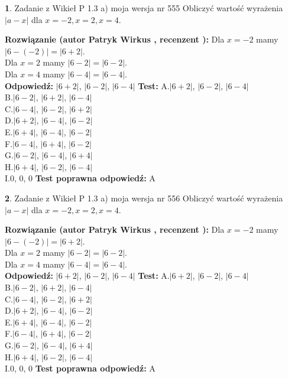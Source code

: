 \documentclass[12pt, a4paper]{article}
\theoremstyle{definition} %
\newtheorem{zad}{}
\newcommand{\zadStart}[1]{\begin{zad}#1\newline}
\newcommand{\zadStop}{\end{zad}}
\newcommand{\rozwStart}[2]{\noindent \textbf{Rozwiązanie (autor #1 , recenzent #2): }\newline}
\newcommand{\rozwStop}{\newline}
\newcommand{\odpStart}{\noindent \textbf{Odpowiedź:}\newline}
\newcommand{\odpStop}{\newline}
\newcommand{\testStart}{\noindent \textbf{Test:}\newline}
\newcommand{\testStop}{\newline}
\newcommand{\kluczStart}{\noindent \textbf{Test poprawna odpowiedź:}\newline}
\newcommand{\kluczStop}{\newline}
\begin{document}
\zadStart{Zadanie z Wikieł P 1.3 a) moja wersja nr 555}
Obliczyć wartość wyrażenia $|a - x|$ dla $x=-2,x=2,x=4$.
\zadStop
\rozwStart{Patryk Wirkus}{}
Dla $x = -2$ mamy $|6 - (-2)| = |6 + 2|$.\\
Dla $x = 2$ mamy $|6 - 2| = |6 - 2|$.\\
Dla $x = 4$ mamy $|6 - 4| = |6 - 4|$.\\
\rozwStop
\odpStart
$|6 + 2|$, $|6 - 2|$, $|6 - 4|$
\odpStop
\testStart
A.$|6 + 2|$, $|6 - 2|$, $|6 - 4|$\\
B.$|6 - 2|$, $|6 + 2|$, $|6 - 4|$\\
C.$|6 - 4|$, $|6 - 2|$, $|6 + 2|$\\
D.$|6 + 2|$, $|6 - 4|$, $|6 - 2|$\\
E.$|6 + 4|$, $|6 - 4|$, $|6 - 2|$\\
F.$|6 - 4|$, $|6 + 4|$, $|6 - 2|$\\
G.$|6 - 2|$, $|6 - 4|$, $|6 + 4|$\\
H.$|6 + 4|$, $|6 - 2|$, $|6 - 4|$\\
I.$0$, $0$, $0$
\testStop
\kluczStart
A
\kluczStop



\zadStart{Zadanie z Wikieł P 1.3 a) moja wersja nr 556}
Obliczyć wartość wyrażenia $|a - x|$ dla $x=-2,x=2,x=4$.
\zadStop
\rozwStart{Patryk Wirkus}{}
Dla $x = -2$ mamy $|6 - (-2)| = |6 + 2|$.\\
Dla $x = 2$ mamy $|6 - 2| = |6 - 2|$.\\
Dla $x = 4$ mamy $|6 - 4| = |6 - 4|$.\\
\rozwStop
\odpStart
$|6 + 2|$, $|6 - 2|$, $|6 - 4|$
\odpStop
\testStart
A.$|6 + 2|$, $|6 - 2|$, $|6 - 4|$\\
B.$|6 - 2|$, $|6 + 2|$, $|6 - 4|$\\
C.$|6 - 4|$, $|6 - 2|$, $|6 + 2|$\\
D.$|6 + 2|$, $|6 - 4|$, $|6 - 2|$\\
E.$|6 + 4|$, $|6 - 4|$, $|6 - 2|$\\
F.$|6 - 4|$, $|6 + 4|$, $|6 - 2|$\\
G.$|6 - 2|$, $|6 - 4|$, $|6 + 4|$\\
H.$|6 + 4|$, $|6 - 2|$, $|6 - 4|$\\
I.$0$, $0$, $0$
\testStop
\kluczStart
A
\kluczStop
\end{document}

